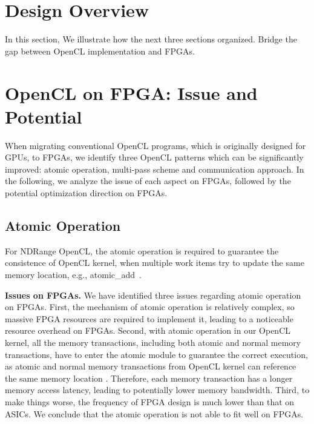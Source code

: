 \section{Design Overview}
In this section, 
We illustrate how the next three sections organized. 
Bridge the gap between OpenCL implementation and FPGAs. 

\section{OpenCL on FPGA: Issue and Potential}
\label{sec_patterns}
When migrating conventional OpenCL programs, which is originally designed for GPUs, to FPGAs, we identify three OpenCL patterns which can be significantly improved: atomic operation, multi-pass scheme and communication approach. In the following, we analyze the issue of each aspect on FPGAs, followed by the potential optimization direction on FPGAs. 

\subsection{Atomic Operation}
For NDRange OpenCL, the atomic operation is required to guarantee the consistence of OpenCL kernel, when multiple work items try to update the same memory location, e.g., atomic\_add~\cite{opencl_spec, atomic_fpga16}. 

{\bf Issues on FPGAs. }We have identified three issues regarding atomic operation on FPGAs. First, the mechanism of atomic operation is relatively complex, so massive FPGA resources are required to implement it, leading to a noticeable resource overhead on FPGAs. %
Second, with atomic operation in our OpenCL kernel, all the memory transactions, including both atomic and normal memory transactions, have to enter the atomic module to guarantee the correct execution, as atomic and normal memory transactions from OpenCL kernel can reference the same memory location . Therefore, each memory transaction has a longer memory access latency, leading to potentially lower memory bandwidth.  
Third, to make things worse, the frequency of FPGA design is much lower than that on ASICs. We conclude that the atomic operation is not able to fit well on FPGAs.  %

